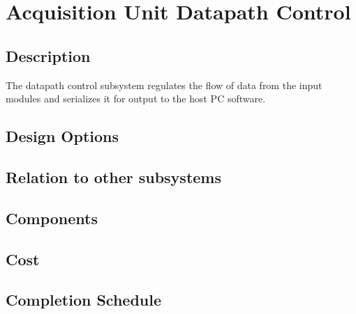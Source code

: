 
\section[Datapath Control]{Acquisition Unit Datapath Control}
\subsection{Description}
The datapath control subsystem regulates the flow of data from the input modules and serializes it for output to the host PC software. 

\subsection{Design Options}


\subsection{Relation to other subsystems}

\subsection{Components}

\subsection{Cost}

\subsection{Completion Schedule}
